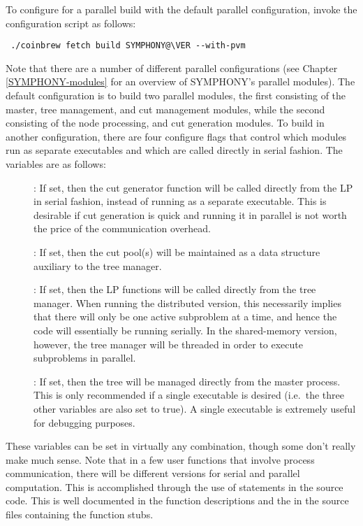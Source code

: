 
To configure for a parallel build with the default parallel configuration,
invoke the configuration script as follows:
{\color{brown}
\begin{verbatim}
 ./coinbrew fetch build SYMPHONY@\VER --with-pvm
\end{verbatim}
} 
Note that there are a number of different parallel configurations (see
Chapter \ref{SYMPHONY-modules} for an overview of SYMPHONY's parallel
modules). The default configuration is to build two parallel modules, the
first consisting of the master, tree management, and cut management modules,
while the second consisting of the node processing, and cut generation
modules. To build in another configuration, there are four configure flags
that control which modules run as separate executables and which are called
directly in serial fashion. The variables are as follows:
\begin{description}
        \item[] : If set, then the cut generator function will
        be called directly from the LP in serial fashion, instead of running
        as a separate executable. This is desirable if cut generation is quick
        and running it in parallel is not worth the price of the communication
        overhead.
        \item[] : If set, then the cut pool(s) will be
        maintained as a data structure auxiliary to the tree manager.
        \item[] : If set, then the LP functions will be called
        directly from the tree manager. When running the distributed version,
        this necessarily implies that there will only be one active subproblem
        at a time, and hence the code will essentially be running serially. In
        the shared-memory version, however, the tree manager will be threaded
        in order to execute subproblems in parallel.
        \item[] : If set, then the tree will be managed
        directly from the master process. This is only recommended if a single
        executable is desired (i.e.~the three other variables are also set to
        true). A single executable is extremely useful for debugging purposes.
\end{description}
These variables can be set in virtually any combination, though some
don't really make much sense. Note that in a few user functions that
involve process communication, there will be different versions for
serial and parallel computation. This is accomplished through the use
of  statements in the source code. This is well documented
in the function descriptions and the in the source files containing
the function stubs.

